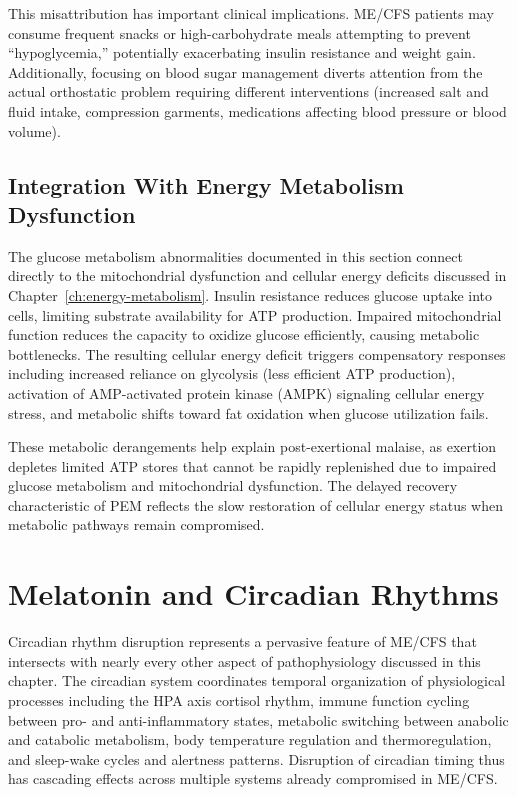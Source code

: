 This misattribution has important clinical implications. ME/CFS patients may consume frequent snacks or high-carbohydrate meals attempting to prevent ``hypoglycemia,'' potentially exacerbating insulin resistance and weight gain. Additionally, focusing on blood sugar management diverts attention from the actual orthostatic problem requiring different interventions (increased salt and fluid intake, compression garments, medications affecting blood pressure or blood volume).

\subsection{Integration With Energy Metabolism Dysfunction}

The glucose metabolism abnormalities documented in this section connect directly to the mitochondrial dysfunction and cellular energy deficits discussed in Chapter~\ref{ch:energy-metabolism}. Insulin resistance reduces glucose uptake into cells, limiting substrate availability for ATP production. Impaired mitochondrial function reduces the capacity to oxidize glucose efficiently, causing metabolic bottlenecks. The resulting cellular energy deficit triggers compensatory responses including increased reliance on glycolysis (less efficient ATP production), activation of AMP-activated protein kinase (AMPK) signaling cellular energy stress, and metabolic shifts toward fat oxidation when glucose utilization fails.

These metabolic derangements help explain post-exertional malaise, as exertion depletes limited ATP stores that cannot be rapidly replenished due to impaired glucose metabolism and mitochondrial dysfunction. The delayed recovery characteristic of PEM reflects the slow restoration of cellular energy status when metabolic pathways remain compromised.

\section{Melatonin and Circadian Rhythms}
\label{sec:circadian}

Circadian rhythm disruption represents a pervasive feature of ME/CFS that intersects with nearly every other aspect of pathophysiology discussed in this chapter. The circadian system coordinates temporal organization of physiological processes including the HPA axis cortisol rhythm, immune function cycling between pro- and anti-inflammatory states, metabolic switching between anabolic and catabolic metabolism, body temperature regulation and thermoregulation, and sleep-wake cycles and alertness patterns. Disruption of circadian timing thus has cascading effects across multiple systems already compromised in ME/CFS.

